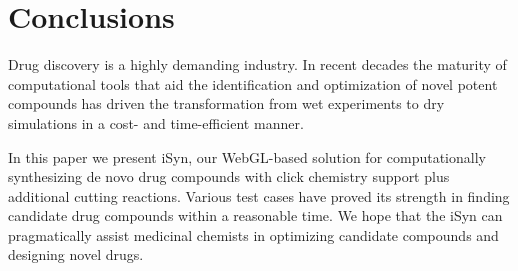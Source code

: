 \section{Conclusions}

Drug discovery is a highly demanding industry. In recent decades the maturity of computational tools that aid the identification and optimization of novel potent compounds has driven the transformation from wet experiments to dry simulations in a cost- and time-efficient manner.

In this paper we present iSyn, our WebGL-based solution for computationally synthesizing de novo drug compounds with click chemistry support plus additional cutting reactions. Various test cases have proved its strength in finding candidate drug compounds within a reasonable time. We hope that the iSyn can pragmatically assist medicinal chemists in optimizing candidate compounds and designing novel drugs.

